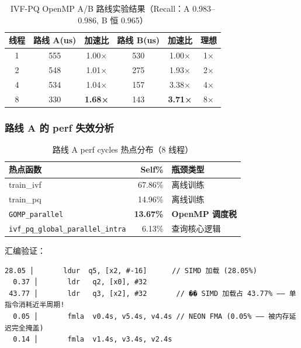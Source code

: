 \documentclass[UTF8,a4paper,10pt]{ctexart}
\begin{document}
\begin{table}[H]
\centering
\caption{IVF-PQ OpenMP A/B 路线实验结果（Recall：A 0.983--0.986, B 恒 0.965）}
\begin{tabular}{cccccc}
\hline
线程 & 路线 A(us) & 加速比 & 路线 B(us) & 加速比 & 理想 \\
\hline
1 & 555 & 1.00× & 530 & 1.00× & 1× \\
2 & 548 & 1.01× & 275 & 1.93× & 2× \\
4 & 534 & 1.04× & 157 & 3.38× & 4× \\
8 & 330 & \textbf{1.68×} & 143  & \textbf{3.71×} & 8× \\
\hline
\end{tabular}
\end{table}

\subsubsection{路线 A 的 perf 失效分析}

\begin{table}[H]
\centering
\caption{路线 A perf cycles 热点分布（8 线程）}
\begin{tabular}{lrl}
\hline
热点函数 & Self\% & 瓶颈类型 \\
\hline
train\_ivf & 67.86\% & 离线训练 \\
train\_pq & 14.96\% & 离线训练 \\
\texttt{GOMP\_parallel} & \textbf{13.67\%} & \textbf{OpenMP 调度税} \\
\texttt{ivf\_pq\_global\_parallel\_intra} & 6.13\% & 查询核心逻辑 \\
\hline
\end{tabular}
\end{table}

汇编验证：

\begin{lstlisting}[language={[x86masm]Assembler}, caption={路线 A 热点汇编：SIMD 加载指令成为周期黑洞}]
 28.05 │       ldur  q5, [x2, #-16]      // SIMD 加载 (28.05%)
  0.37 │       ldr   q2, [x0], #32
 43.77 │       ldr   q3, [x2], #32       // �� SIMD 加载占 43.77% —— 单指令消耗近半周期!
  0.05 │       fmla  v0.4s, v5.4s, v4.4s // NEON FMA (0.05% —— 被内存延迟完全掩盖)
  0.14 │       fmla  v1.4s, v3.4s, v2.4s
\end{lstlisting}
\end{document}
